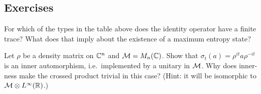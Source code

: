 \subsection*{Exercises}
\begin{exercise}\label{ex:punchline:1}
For which of the types in the table above does the identity operator have a finite trace? What does that imply about the existence of a maximum entropy state?
\end{exercise}
\begin{exercise}\label{ex:punchline:2}
Let $\rho$ be a density matrix on $\mathbb{C}^n$ and $\mathcal{M}=M_n(\mathbb{C})$. Show that $\sigma_t(a)=\rho^{it}a\rho^{-it}$ is an inner automorphism, i.e.\ implemented by a unitary in $\mathcal{M}$. Why does inner-ness make the crossed product trivial in this case? (Hint: it will be isomorphic to $\mathcal{M}\otimes L^\infty(\mathbb{R})$.)
\end{exercise}

